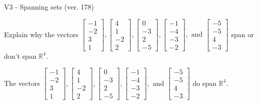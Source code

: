 \begin{exercise}
  \begin{exerciseTitle}V3 - Spanning sets (ver. 178)\end{exerciseTitle}
  \begin{exerciseStatement}
    Explain why the vectors \(\left[\begin{array}{r}
-1 \\
-2 \\
3 \\
1
\end{array}\right] , \left[\begin{array}{r}
4 \\
1 \\
-2 \\
2
\end{array}\right] , \left[\begin{array}{r}
0 \\
-3 \\
2 \\
-5
\end{array}\right] , \left[\begin{array}{r}
-1 \\
-4 \\
-3 \\
-2
\end{array}\right] , \text{ and } \left[\begin{array}{r}
-5 \\
-5 \\
4 \\
-3
\end{array}\right]\) span or don't span \(\mathbb{R}^4\). 
	


  \end{exerciseStatement}
  \begin{exerciseAnswer}
   The vectors \(\left[\begin{array}{r}
-1 \\
-2 \\
3 \\
1
\end{array}\right] , \left[\begin{array}{r}
4 \\
1 \\
-2 \\
2
\end{array}\right] , \left[\begin{array}{r}
0 \\
-3 \\
2 \\
-5
\end{array}\right] , \left[\begin{array}{r}
-1 \\
-4 \\
-3 \\
-2
\end{array}\right] , \text{ and } \left[\begin{array}{r}
-5 \\
-5 \\
4 \\
-3
\end{array}\right]\) 
  	 do  
	span \(\mathbb{R}^4\).
  



\end{exerciseAnswer}
\end{exercise}

